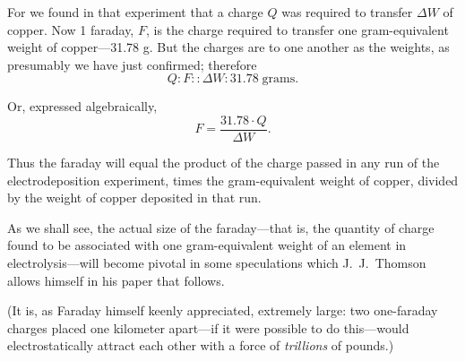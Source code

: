 For we found in that experiment that a charge $Q$ was required to
transfer $\Delta W$ of copper. Now 1 faraday, $F$, is the charge
required to transfer one gram-equivalent weight of copper---31.78 g.
But the charges are to one another as the weights, as presumably we have
just confirmed; therefore
\begin{equation*}
Q : F :: \Delta W : 31.78\; \text{grams}.
\end{equation*}

Or, expressed algebraically,
\begin{equation*}
F = \frac{31.78\cdot Q}{\Delta W}.
\end{equation*}

Thus the faraday will equal the product of the charge passed in any run
of the electrodeposition experiment, times the gram-equivalent weight of
copper, divided by the weight of copper deposited in that run.

As we shall see, the actual size of the faraday---that is, the quantity
of charge found to be associated with one gram-equivalent weight of an
element in electrolysis---will become pivotal in some speculations which
J.\ J.\ Thomson allows himself in his paper that follows.

(It is, as Faraday himself keenly appreciated, extremely large: two
one-faraday charges placed one kilometer apart---if it were possible to do
this---would e\-lec\-tro\-stat\-ic\-al\-ly attract each other with a force of
\emph{trillions} of pounds.)
